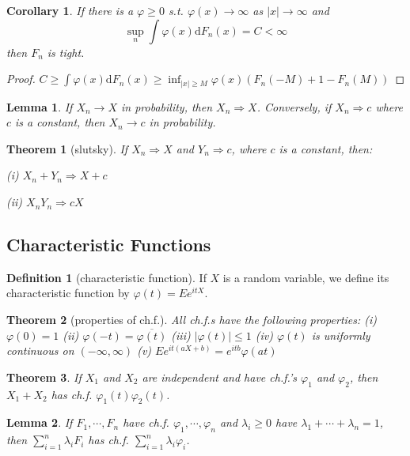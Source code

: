 \documentclass{article}
\newtheorem{Thm}{Theorem}[section]
\newtheorem{Cor}{Corollary}[Thm]
\newtheorem{Lem}{Lemma}[section]
\theoremstyle{definition}
\newtheorem{Def}{Definition}[section]
\begin{document}
\begin{Cor}
If there is a $\varphi\ge0$ s.t. $\varphi(x)\to\infty$ as $\left | x \right | \to\infty$ and 
\[\sup_n\int\varphi(x)\mathrm{d}F_n(x)=C<\infty\] then $F_n$ is tight.
\end{Cor}
\begin{proof}
$C\ge\int\varphi(x)\mathrm{d}F_n(x)\ge\inf_{\left | x \right |\ge M}\varphi(x)(F_n(-M)+1-F_n(M))$
\end{proof}
\begin{Lem}
If $X_n\longrightarrow X$ in probability, then $X_n\Longrightarrow X$. Conversely, if $X_n\Longrightarrow c$ where $c$ is a constant, then $X_n\longrightarrow c$ in probability.
\end{Lem}
\begin{Thm}[slutsky]
If $X_n\Longrightarrow X$ and $Y_n\Longrightarrow c$, where $c$ is a constant, then:\par
(i) $X_n+Y_n\Longrightarrow X+c$\par
(ii) $X_nY_n\Longrightarrow cX$
\end{Thm}

\subsection{Characteristic Functions}
\begin{Def}[characteristic function]
    If $X$ is a random variable, we define its characteristic function by $\varphi(t)=Ee^{itX}$.
\end{Def}
\begin{Thm}[properties of ch.f.]
    All ch.f.s have the following properties:\newline 
    (i) $\varphi(0)=1$\newline 
    (ii) $\varphi(-t)=\overline{\varphi(t)}$\newline 
    (iii) $\left|\varphi(t)\right|\le 1$\newline 
    (iv) $\varphi(t)$ is uniformly continuous on $(-\infty,\infty)$\newline 
    (v) $Ee^{it(aX+b)}=e^{itb}\varphi(at)$
\end{Thm}
\begin{Thm}
    If $X_1$ and $X_2$ are independent and have ch.f.'s $\varphi_1$ and $\varphi_2$, then $X_1+X_2$ has ch.f. $\varphi_1(t)\varphi_2(t)$.
\end{Thm}
\begin{Lem}
    If $F_1,\cdots,F_n$ have ch.f. $\varphi_1,\cdots,\varphi_n$ and $\lambda_i\ge 0$ have $\lambda_1+\cdots+\lambda_n=1$, then $\sum_{i=1}^n\lambda_iF_i$ has ch.f. $\sum_{i=1}^n\lambda_i\varphi_i$.
\end{Lem}
\end{document}
